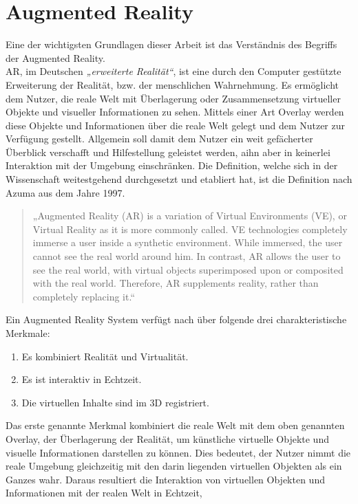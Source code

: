 \section{Augmented Reality}
\label{chap:Augmented Reality}
Eine der wichtigsten Grundlagen dieser Arbeit ist das Verständnis des Begriffs der Augmented Reality.
\\ 
\acl{AR}, im Deutschen \textit{„erweiterte Realität“}, ist eine durch den Computer gestützte Erweiterung der Realität, bzw. der menschlichen 
Wahrnehmung. Es ermöglicht dem Nutzer, die reale Welt mit Überlagerung oder Zusammensetzung virtueller Objekte und visueller Informationen
zu sehen. Mittels einer Art Overlay werden diese Objekte und Informationen über die reale Welt gelegt und dem Nutzer zur Verfügung gestellt. 
Allgemein soll damit dem Nutzer ein weit gefächerter Überblick verschafft und Hilfestellung geleistet werden, aihn aber in keinerlei 
Interaktion mit der Umgebung einschränken. Die Definition, welche sich in der Wissenschaft weitestgehend durchgesetzt und etabliert hat, ist 
die Definition nach Azuma aus dem Jahre 1997.
\begin{quote}
    „Augmented Reality (AR) is a variation of Virtual Environments (VE), or Virtual Reality as it is more commonly called. VE 
    technologies completely immerse a user inside a synthetic environment. While immersed, the user cannot see the real world around him. 
    In contrast, AR allows the user to see the real world, with virtual objects superimposed upon or composited with the real world. 
    Therefore, AR supplements reality, rather than completely replacing it.“ \cite{azuma.1997a}
\end{quote}
Ein Augmented Reality System verfügt nach \cite{azuma.1997a} über folgende drei charakteristische Merkmale: 
\begin{enumerate}
    \item Es kombiniert Realität und Virtualität.
    \item Es ist interaktiv in Echtzeit.
    \item Die virtuellen Inhalte sind im 3D registriert.
\end{enumerate}
Das erste genannte Merkmal kombiniert die reale Welt mit dem oben genannten Overlay, der Überlagerung der Realität, um künstliche virtuelle 
Objekte und visuelle Informationen darstellen zu können. Dies bedeutet, der Nutzer nimmt die reale Umgebung gleichzeitig mit den darin liegenden virtuellen 
Objekten als ein Ganzes wahr. Daraus resultiert die Interaktion von virtuellen Objekten und Informationen mit der realen Welt in Echtzeit, 
